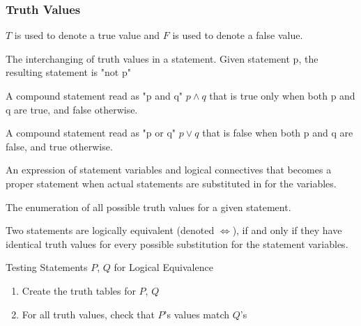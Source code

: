 \documentclass[11pt]{article}
\begin{document}
\subsubsection{Truth Values}

$T$ is used to denote a true value and $F$ is used to denote a false value.

\begin{definition}[Negation]\label{def:negation}
    The interchanging of truth values in a statement.
    Given statement p, the resulting statement is "not p"
\end{definition}

\begin{definition}[Conjunction]\label{def:conjunction}
    A compound statement read as "p and q" $p \land q$ that 
    is true only when both p and q are true, and false otherwise.
\end{definition}

\begin{definition}[Disjunction]\label{def:disjunction}
    A compound statement read as "p or q" $p \lor q$
    that is false when both p and q are false, and true otherwise.
\end{definition}

\begin{definition}\label{def:statement-form}
    An expression of statement variables
    and logical connectives that becomes a proper statement
    when actual statements are substituted in for the variables.
\end{definition}

\begin{definition}\label{def:truth-table}
    The enumeration of all possible truth values for a given statement.
\end{definition}

\begin{definition}\label{def:logical-eq}
    Two statements are logically equivalent (denoted $\iff$),
    if and only if they have identical truth values
    for every possible substitution for the statement variables. 
\end{definition}

\large{Testing Statements $P$, $Q$ for Logical Equivalence}
\begin{enumerate}
    \item Create the truth tables for $P$, $Q$
    \item For all truth values, check that $P$'s values match $Q$'s
\end{enumerate}
\end{document}
